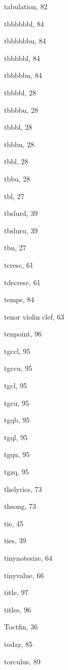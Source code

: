 \begin{theindex}
  \item tabulation, 82
  \item {\Bslash tbbbbbbl}, 84
  \item {\Bslash tbbbbbbu}, 84
  \item {\Bslash tbbbbbl}, 84
  \item {\Bslash tbbbbbu}, 84
  \item {\Bslash tbbbbl}, 28
  \item {\Bslash tbbbbu}, 28
  \item {\Bslash tbbbl}, 28
  \item {\Bslash tbbbu}, 28
  \item {\Bslash tbbl}, 28
  \item {\Bslash tbbu}, 28
  \item {\Bslash tbl}, 27
  \item {\Bslash tbslurd}, 39
  \item {\Bslash tbsluru}, 39
  \item {\Bslash tbu}, 27
  \item {\Bslash tcresc}, 61
  \item {\Bslash tdecresc}, 61
  \item {\Bslash temps}, 84
  \item tenor violin clef, 63
  \item {\Bslash tenpoint}, 96
  \item {\Bslash tgccl}, 95
  \item {\Bslash tgccu}, 95
  \item {\Bslash tgcl}, 95
  \item {\Bslash tgcu}, 95
  \item {\Bslash tgqb}, 95
  \item {\Bslash tgql}, 95
  \item {\Bslash tgqu}, 95
  \item {\Bslash tgzq}, 95
  \item {\Bslash thelyrics}, 73
  \item {\Bslash thsong}, 73
  \item {\Bslash tie}, 45
  \item ties, 39
  \item {\Bslash tinynotesize}, 64
  \item {\Bslash tinyvalue}, 66
  \item {\Bslash title}, 97
  \item titles, 96
  \item {\Bslash Toctfin}, 36
  \item {\Bslash today}, 85
  \item {\Bslash torculus}, 89

\end{theindex}
